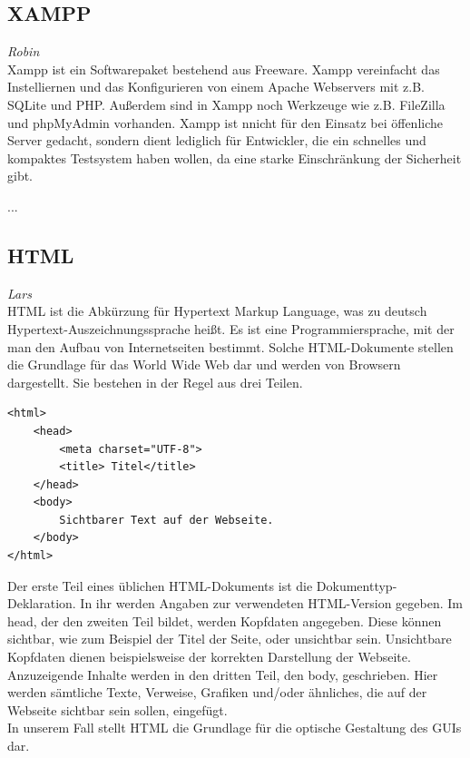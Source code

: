 \documentclass[12pt,a4paper,bibliography=totocnumbered,listof=totocnumbered]{scrartcl}
\begin{document}
\subsection{XAMPP}
\label{sec:XAMPP}
\emph{Robin}\\
Xampp ist ein Softwarepaket bestehend aus Freeware. Xampp vereinfacht das Instelliernen und das Konfigurieren von einem Apache Webservers mit z.B. SQLite und PHP. Außerdem sind in Xampp noch Werkzeuge wie z.B. FileZilla und phpMyAdmin vorhanden. Xampp ist nnicht für den Einsatz bei öffenliche Server gedacht, sondern dient lediglich für Entwickler, die ein schnelles und kompaktes Testsystem haben wollen, da eine starke Einschränkung der Sicherheit gibt.\cite{XAMPP}

...

\subsection{HTML}
\label{sec:HTML}
\emph{Lars}\\
HTML ist die Abkürzung für \glqq Hypertext Markup Language\grqq, was zu deutsch \glqq Hypertext-Auszeichnungssprache\grqq{} heißt. Es ist eine Programmiersprache, mit der man den Aufbau von Internetseiten bestimmt. Solche HTML-Dokumente stellen die Grundlage für das World Wide Web dar und werden von Browsern dargestellt.\cite{HTML}\cite{Hypertext_Markup_Language} Sie bestehen in der Regel aus drei Teilen.\cite{HTML/Dokumentstruktur_und_Aufbau} 

\pagebreak

\begin{lstlisting}[caption= Beispiel für ein einfaches HTML-Dokument, label=lst:HTML]
<html>
	<head>
		<meta charset="UTF-8">		
		<title> Titel</title>
	</head>
	<body>
		Sichtbarer Text auf der Webseite.
	</body>
</html>
\end{lstlisting}

Der erste Teil eines üblichen HTML-Dokuments ist die Dokumenttyp-Deklaration. In ihr werden Angaben zur verwendeten HTML-Version gegeben. Im \glqq head\grqq , der den zweiten Teil bildet, werden  Kopfdaten angegeben. Diese können sichtbar, wie zum Beispiel der Titel der Seite, oder unsichtbar sein. Unsichtbare Kopfdaten dienen beispielsweise der korrekten Darstellung der Webseite.\cite{HTML/Kopfdaten} Anzuzeigende Inhalte werden in den dritten Teil,  den \glqq body\grqq , geschrieben. Hier werden sämtliche Texte, Verweise, Grafiken und/oder ähnliches, die auf der Webseite sichtbar sein sollen, eingefügt.\cite{HTML/Dokumentstruktur_und_Aufbau} \\
In unserem Fall stellt HTML die Grundlage für die optische Gestaltung des GUIs dar.
\end{document}
